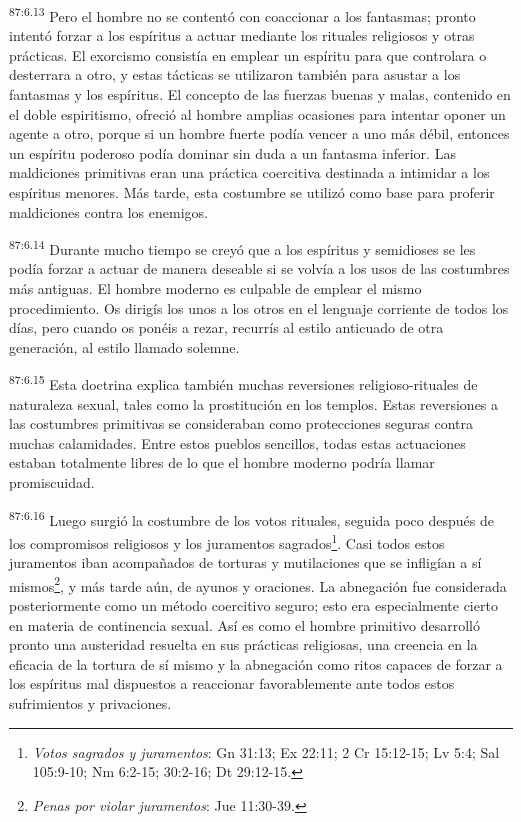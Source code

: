 \documentclass[twoside, 11pt]{book}
\begin{document}
\par
\textsuperscript{87:6.13} Pero el hombre no se contentó con coaccionar a los fantasmas; pronto intentó forzar a los espíritus a actuar mediante los rituales religiosos y otras prácticas. El exorcismo consistía en emplear un espíritu para que controlara o desterrara a otro, y estas tácticas se utilizaron también para asustar a los fantasmas y los espíritus. El concepto de las fuerzas buenas y malas, contenido en el doble espiritismo, ofreció al hombre amplias ocasiones para intentar oponer un agente a otro, porque si un hombre fuerte podía vencer a uno más débil, entonces un espíritu poderoso podía dominar sin duda a un fantasma inferior. Las maldiciones primitivas eran una práctica coercitiva destinada a intimidar a los espíritus menores. Más tarde, esta costumbre se utilizó como base para proferir maldiciones contra los enemigos.

\par
\textsuperscript{87:6.14} Durante mucho tiempo se creyó que a los espíritus y semidioses se les podía forzar a actuar de manera deseable si se volvía a los usos de las costumbres más antiguas. El hombre moderno es culpable de emplear el mismo procedimiento. Os dirigís los unos a los otros en el lenguaje corriente de todos los días, pero cuando os ponéis a rezar, recurrís al estilo anticuado de otra generación, al estilo llamado solemne.

\par
\textsuperscript{87:6.15} Esta doctrina explica también muchas reversiones religioso-rituales de naturaleza sexual, tales como la prostitución en los templos. Estas reversiones a las costumbres primitivas se consideraban como protecciones seguras contra muchas calamidades. Entre estos pueblos sencillos, todas estas actuaciones estaban totalmente libres de lo que el hombre moderno podría llamar promiscuidad.

\par
\textsuperscript{87:6.16} Luego surgió la costumbre de los votos rituales, seguida poco después de los compromisos religiosos y los juramentos sagrados\footnote{\textit{Votos sagrados y juramentos}: Gn 31:13; Ex 22:11; 2 Cr 15:12-15; Lv 5:4; Sal 105:9-10; Nm 6:2-15; 30:2-16; Dt 29:12-15.}. Casi todos estos juramentos iban acompañados de torturas y mutilaciones que se infligían a sí mismos\footnote{\textit{Penas por violar juramentos}: Jue 11:30-39.}, y más tarde aún, de ayunos y oraciones. La abnegación fue considerada posteriormente como un método coercitivo seguro; esto era especialmente cierto en materia de continencia sexual. Así es como el hombre primitivo desarrolló pronto una austeridad resuelta en sus prácticas religiosas, una creencia en la eficacia de la tortura de sí mismo y la abnegación como ritos capaces de forzar a los espíritus mal dispuestos a reaccionar favorablemente ante todos estos sufrimientos y privaciones.
\end{document}
